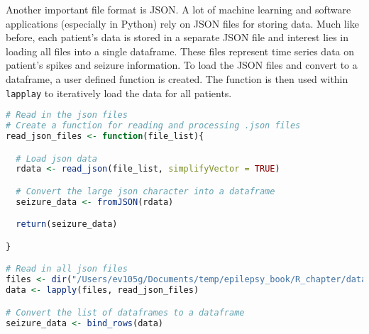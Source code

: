Another important file format is JSON. A lot of machine learning and software applications (especially in Python) rely on JSON files for storing data. Much like before, each patient's data is stored in a separate JSON file and interest lies in loading all files into a single dataframe. These files represent time series data on patient's spikes and seizure information. To load the JSON files and convert to a dataframe, a user defined function is created. The function is then used within \verb|lapplay| to iteratively load the data for all patients.
\begin{lstlisting}[language=R]
# Read in the json files
# Create a function for reading and processing .json files
read_json_files <- function(file_list){

  # Load json data
  rdata <- read_json(file_list, simplifyVector = TRUE)

  # Convert the large json character into a dataframe
  seizure_data <- fromJSON(rdata)

  return(seizure_data)

}

# Read in all json files
files <- dir("/Users/ev105g/Documents/temp/epilepsy_book/R_chapter/data", recursive = TRUE, full.names = TRUE, pattern = "sdata.json$")
data <- lapply(files, read_json_files)

# Convert the list of dataframes to a dataframe
seizure_data <- bind_rows(data)
\end{lstlisting}


